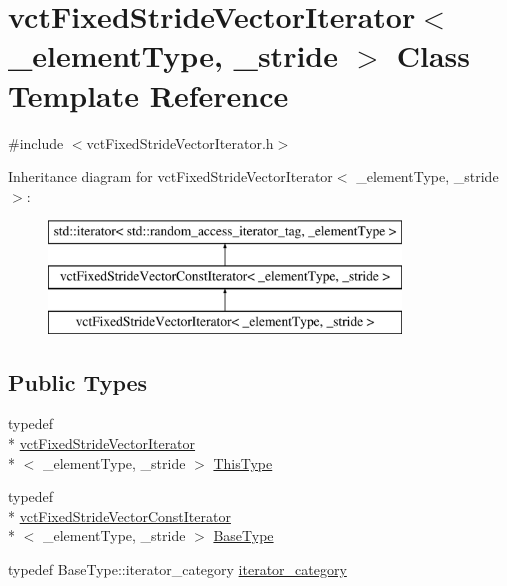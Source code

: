 \hypertarget{classvct_fixed_stride_vector_iterator}{\section{vct\-Fixed\-Stride\-Vector\-Iterator$<$ \-\_\-element\-Type, \-\_\-stride $>$ Class Template Reference}
\label{classvct_fixed_stride_vector_iterator}
}


{\ttfamily \#include $<$vct\-Fixed\-Stride\-Vector\-Iterator.\-h$>$}

Inheritance diagram for vct\-Fixed\-Stride\-Vector\-Iterator$<$ \-\_\-element\-Type, \-\_\-stride $>$\-:\begin{figure}[H]
\begin{center}
\leavevmode
\includegraphics[height=3.000000cm]{d8/d66/classvct_fixed_stride_vector_iterator}
\end{center}
\end{figure}
\subsection*{Public Types}
\begin{DoxyCompactItemize}
\item 
typedef \\*
\hyperlink{classvct_fixed_stride_vector_iterator}{vct\-Fixed\-Stride\-Vector\-Iterator}\\*
$<$ \-\_\-element\-Type, \-\_\-stride $>$ \hyperlink{classvct_fixed_stride_vector_iterator_a2a515ead5522ffc2eb376b301053d5f2}{This\-Type}
\item 
typedef \\*
\hyperlink{classvct_fixed_stride_vector_const_iterator}{vct\-Fixed\-Stride\-Vector\-Const\-Iterator}\\*
$<$ \-\_\-element\-Type, \-\_\-stride $>$ \hyperlink{classvct_fixed_stride_vector_iterator_a3f9c3435364bd43064a82e9b1446f3be}{Base\-Type}
\item 
typedef Base\-Type\-::iterator\-\_\-category \hyperlink{classvct_fixed_stride_vector_iterator_a2f2031bcd38f41975bc90a9f3b8af46f}{iterator\-\_\-category}
\end{DoxyCompactItemize}
